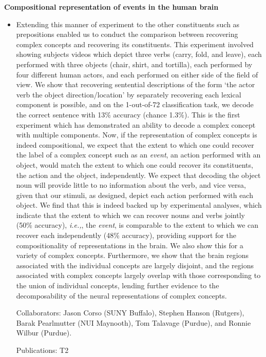 \documentclass[10pt]{article}
\newenvironment{researchBlock}[1]{%
  \vspace*{0.5ex}
  {\noindent\large \textbf{#1}}
  \begin{itemize}\item}
  {\end{itemize}\vspace{3ex}}
\newcommand{\refr}[1]{{\color{RoyalBlue} #1}}
\newcommand{\ie}{\emph{i.e.,}}
\begin{document}
\begin{researchBlock} {Compositional representation of events in the human brain}
  Extending this manner of experiment to the other constituents such as
  prepositions enabled us to conduct the comparison between recovering complex
  concepts and recovering its constituents.
  This experiment involved showing subjects videos which depict three verbs
  (carry, fold, and leave), each performed with three objects (chair, shirt,
  and tortilla), each performed by four different human actors, and each
  performed on either side of the field of view.
  We show that recovering sentential descriptions of the form `the actor verb
  the object direction/location' by separately recovering each lexical
  component is possible, and on the 1-out-of-72 classification task, we decode
  the correct sentence with 13\% accuracy (chance 1.3\%).
  This is the first experiment which has demonstrated an ability to decode a
  complex concept with multiple components.
  Now, if the representation of complex concepts is indeed compositional, we
  expect that the extent to which one could recover the label of a complex
  concept such as an \emph{event}, an action performed with an object, would
  match the extent to which one could recover its constituents, the action and
  the object, independently.
  We expect that decoding the object noun will provide little to no information
  about the verb, and vice versa, given that our stimuli, as designed, depict
  each action performed with each object.
  We find that this is indeed backed up by experimental analyses, which
  indicate that the extent to which we can recover nouns and verbs jointly
  (50\% accuracy), \ie, the \emph{event}, is comparable to the extent to which
  we can recover each independently (48\% accuracy), providing support for the
  compositionality of representations in the brain.
  We also show this for a variety of complex concepts.
  Furthermore, we show that the brain regions associated with the individual
  concepts are largely disjoint, and the regions associated with complex
  concepts largely overlap with those corresponding to the union of individual
  concepts, lending further evidence to the decomposability of the neural
  representations of complex concepts.

  \vspace{2ex}
  Collaborators: Jason Corso (SUNY Buffalo), Stephen Hanson (Rutgers), Barak Pearlmutter (NUI Maynooth),
  Tom Talavage (Purdue), and Ronnie Wilbur (Purdue).

  Publications: \refr{T2}
\end{researchBlock}
\end{document}
